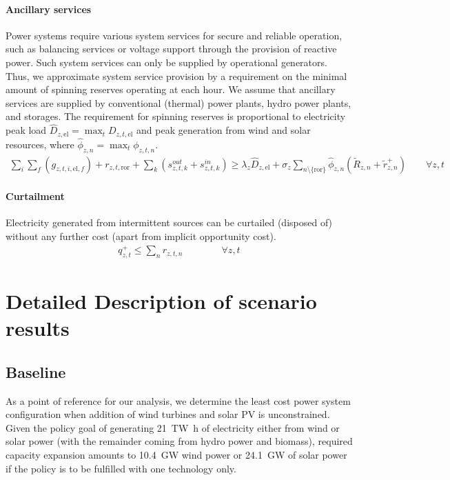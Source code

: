 \documentclass[review, 3p, times]{elsarticle} %
\begin{document}
    \paragraph{Ancillary services}
    Power systems require various system services for secure and reliable operation, such as balancing services or voltage support through the provision of reactive power. Such system services can only be supplied by operational generators. Thus, we approximate system service provision by a requirement on the minimal amount of spinning reserves operating at each hour.
    We assume that ancillary services are supplied by conventional (thermal) power plants, hydro power plants, and storages.
    The requirement for spinning reserves is proportional to electricity peak load $\widehat{D}_{z,\text{el}} = \max_{t} D_{z,t,\text{el}}$ and peak generation from wind and solar resources, where $\widehat{\phi}_{z,n} = \max_{t} \phi_{z,t,n}$.
    \begin{align}
        \sum_{i} \sum_{f} \left( g_{z,t,i,\text{el},f} \right) + r_{z,t,\text{ror}} + \sum_{k} \left( s^{out}_{z,t,k} + s^{in}_{z,t,k} \right) \geq \lambda_{z} \widehat{D}_{z,\text{el}} + \sigma_{z} \sum_{n \setminus \{ \text{ror}\}} \widehat{\phi}_{z,n} (\widetilde{R}_{z,n} + \widetilde{r}^{+}_{z,n}) \qquad \forall z,t
    \end{align}

    \paragraph{Curtailment}
    Electricity generated from intermittent sources can be curtailed (disposed of) without any further cost (apart from implicit opportunity cost).
    \begin{align}
        q^{+}_{z,t} \leq \sum_{n} r_{z,t,n} \qquad \qquad \forall z, t
    \end{align}


    \section{Detailed Description of scenario results} \label{sec:detailedresults}

    \subsection{Baseline} \label{subsec:baseline}
    As a point of reference for our analysis, we determine the least cost power system configuration when addition of
    wind turbines and solar PV is unconstrained.
    Given the policy goal of generating \SI{21}{\tera\watt\hour} of electricity either from wind or solar power (with
    the remainder coming from hydro power and biomass), required capacity expansion amounts to \SI{10.4}{\giga\watt}
    wind power or \SI{24.1}{\giga\watt} of solar power if the policy is to be fulfilled with one technology only.
\end{document}
